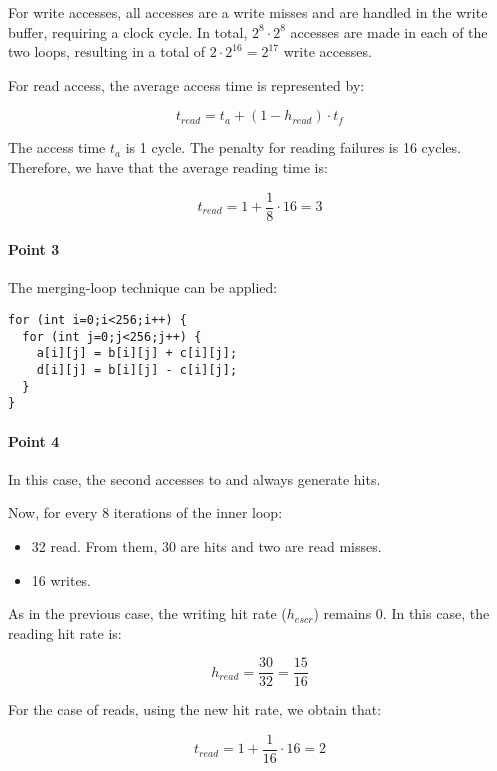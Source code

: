 For write accesses, all accesses are a write misses and are handled in the write buffer, requiring 
a clock cycle. In total, $2^8 \cdot 2^8$ accesses are made in each of the two loops, resulting in a 
total of $2 \cdot 2^{16} = 2^{17}$ write accesses.


For read access, the average access time is represented by:

\[
t_{read} = t_a + (1 - h_{read}) \cdot t_f
\]

The access time $ t_a $ is 1 cycle. The penalty for reading failures is 16 cycles. 
Therefore, we have that the average reading time is:

\[
t_{read} =
1 + \frac{1}{8} \cdot 16 = 
3
\]

\paragraph{Point 3}

The merging-loop technique can be applied:

\begin{lstlisting}
for (int i=0;i<256;i++) {
  for (int j=0;j<256;j++) {
    a[i][j] = b[i][j] + c[i][j];
    d[i][j] = b[i][j] - c[i][j];
  }
}
\end{lstlisting}

\paragraph{Point 4}

In this case, the second accesses to  and  always generate hits.

Now, for every 8 iterations of the inner loop:

\begin{itemize}
  \item 32 read. From them, 30 are hits and two are read misses.
  \item 16 writes.
\end{itemize}

As in the previous case, the writing hit rate  ($h_{escr}$) remains 0. In this case, the reading hit rate is:

\[
h_{read} = \frac{30}{32} = \frac{15}{16}
\]

For the case of reads, using the new  hit rate, we obtain that:

\[
t_{read} =
1 + \frac{1}{16} \cdot 16 = 
2
\]

